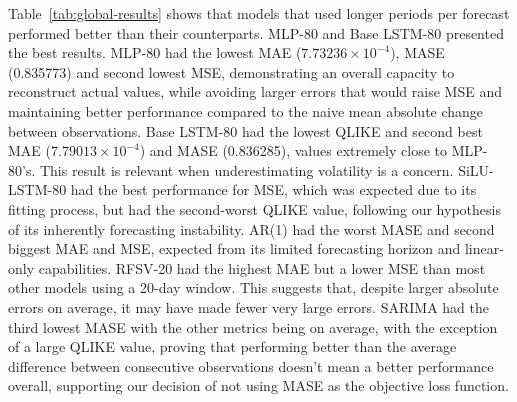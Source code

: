 \documentclass[12pt,a4paper]{article}
\numberwithin{equation}{section}
\numberwithin{table}{section}
\numberwithin{figure}{section}
\begin{document}
Table~\ref{tab:global-results} shows that models that used longer periods per forecast performed better than their counterparts. MLP-80 and Base LSTM-80 presented the best results. MLP-80 had the lowest MAE ($7.73236\times10^{-4}$), MASE (0.835773) and second lowest MSE, demonstrating an overall capacity to reconstruct actual values, while avoiding larger errors that would raise MSE and maintaining better performance compared to the naive mean absolute change between observations. Base LSTM-80 had the lowest QLIKE and second best MAE ($7.79013\times10^{-4}$) and MASE (0.836285), values extremely close to MLP-80's. This result is relevant when underestimating volatility is a concern. SiLU-LSTM-80 had the best performance for MSE, which was expected due to its fitting process, but had the second-worst QLIKE value, following our hypothesis of its inherently forecasting instability. AR(1) had the worst MASE and second biggest MAE and MSE, expected from its limited forecasting horizon and linear-only capabilities. RFSV-20 had the highest MAE but a lower MSE than most other models using a 20-day window. This suggests that, despite larger absolute errors on average, it may have made fewer very large errors. SARIMA had the third lowest MASE with the other metrics being on average, with the exception of a large QLIKE value, proving that performing better than the average difference between consecutive observations doesn't mean a better performance overall, supporting our decision of not using MASE as the objective loss function.
\end{document}
